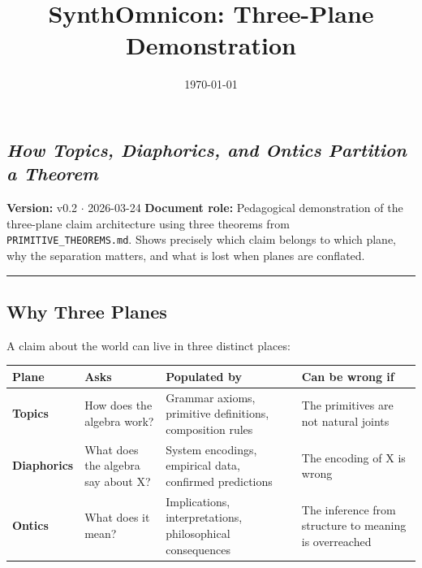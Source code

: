\documentclass[11pt,a4paper]{article}
\begin{document}
\title{SynthOmnicon: Three-Plane Demonstration}
\date{\today}

\maketitle

\subsection{\emph{How Topics, Diaphorics, and Ontics Partition a Theorem}}

\textbf{Version:} v0.2 $\cdot$ 2026-03-24
\textbf{Document role:} Pedagogical demonstration of the three-plane claim architecture using three theorems from \texttt{PRIMITIVE\_THEOREMS.md}. Shows precisely which claim belongs to which plane, why the separation matters, and what is lost when planes are conflated.

\begin{center}
\rule{0.5\textwidth}{0.4pt}
\end{center}

\subsection{Why Three Planes}

A claim about the world can live in three distinct places:

\begin{table}[htbp]
\centering
\small
{}
\begin{tabularx}{\textwidth}{>{\centering\arraybackslash}X >{\centering\arraybackslash}X >{\centering\arraybackslash}X >{\centering\arraybackslash}X}
\toprule
\rowcolor{gray!25}\textbf{Plane} & \textbf{Asks} & \textbf{Populated by} & \textbf{Can be wrong if} \\
\midrule
\rowcolors{1}{white}{gray!10}
\textbf{Topics} & How does the algebra work? & Grammar axioms, primitive definitions, composition rules & The primitives are not natural joints \\
\textbf{Diaphorics} & What does the algebra say about X? & System encodings, empirical data, confirmed predictions & The encoding of X is wrong \\
\textbf{Ontics} & What does it mean? & Implications, interpretations, philosophical consequences & The inference from structure to meaning is overreached \\
\bottomrule
\end{tabularx}
\end{table}
\end{document}
